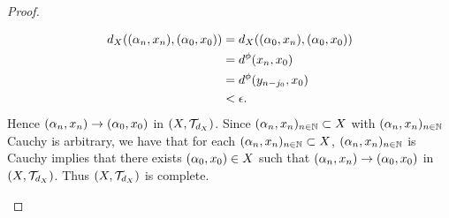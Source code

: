 \documentclass{book}
\begin{document}
\begin{proof}
\begin{itemize}
		\begin{align*}
			d_X((\alpha_n, x_n), (\alpha_0, x_0)) 
			& = d_X((\alpha_0, x_n), (\alpha_0, x_0)) \\
			& = d^{\phi}(x_n, x_0) \\
			& = d^{\phi}(y_{n-j_0}, x_0) \\
			& < \epsilon. 
		\end{align*}
		Hence $(\alpha_n, x_n) \rightarrow (\alpha_0, x_0)$ in $(X, \mathcal{T}_{d_X})$. Since $(\alpha_n, x_n)_{n \in \mathbb{N}} \subset X$ with $(\alpha_n, x_n)_{n \in \mathbb{N}}$ Cauchy is arbitrary, we have that for each $(\alpha_n, x_n)_{n \in \mathbb{N}} \subset X$, $(\alpha_n, x_n)_{n \in \mathbb{N}}$ is Cauchy implies that there exists $(\alpha_0, x_0) \in X$ such that $(\alpha_n, x_n) \rightarrow (\alpha_0, x_0)$ in $(X, \mathcal{T}_{d_X})$. Thus $(X, \mathcal{T}_{d_X})$ is complete.
	\end{itemize}
\end{proof}
\end{document}
